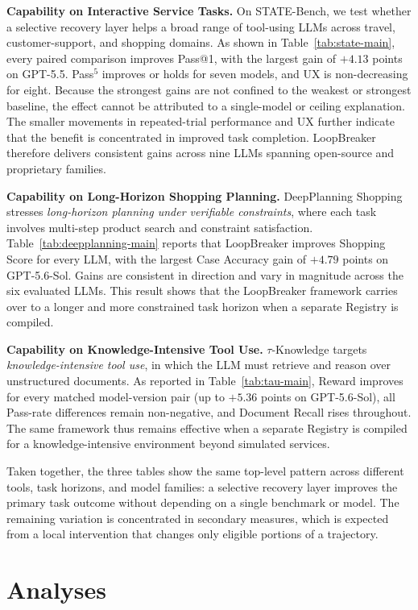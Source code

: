 \documentclass[letterpaper]{article}
\begin{document}
\textbf{Capability on Interactive Service Tasks.}\quad
On STATE-Bench, we test whether a selective recovery layer helps a broad range of tool-using LLMs across travel, customer-support, and shopping domains. As shown in Table~\ref{tab:state-main}, every paired comparison improves Pass@1, with the largest gain of $+4.13$ points on GPT-5.5. Pass$^5$ improves or holds for seven models, and UX is non-decreasing for eight. Because the strongest gains are not confined to the weakest or strongest baseline, the effect cannot be attributed to a single-model or ceiling explanation. The smaller movements in repeated-trial performance and UX further indicate that the benefit is concentrated in improved task completion. LoopBreaker therefore delivers consistent gains across nine LLMs spanning open-source and proprietary families.

\textbf{Capability on Long-Horizon Shopping Planning.}\quad
DeepPlanning Shopping stresses \emph{long-horizon planning under verifiable constraints}, where each task involves multi-step product search and constraint satisfaction. Table~\ref{tab:deepplanning-main} reports that LoopBreaker improves Shopping Score for every LLM, with the largest Case Accuracy gain of $+4.79$ points on GPT-5.6-Sol. Gains are consistent in direction and vary in magnitude across the six evaluated LLMs. This result shows that the LoopBreaker framework carries over to a longer and more constrained task horizon when a separate Registry is compiled.

\textbf{Capability on Knowledge-Intensive Tool Use.}\quad
$\tau$-Knowledge targets \emph{knowledge-intensive tool use}, in which the LLM must retrieve and reason over unstructured documents. As reported in Table~\ref{tab:tau-main}, Reward improves for every matched model-version pair (up to $+5.36$ points on GPT-5.6-Sol), all Pass-rate differences remain non-negative, and Document Recall rises throughout. The same framework thus remains effective when a separate Registry is compiled for a knowledge-intensive environment beyond simulated services.

Taken together, the three tables show the same top-level pattern across different tools, task horizons, and model families: a selective recovery layer improves the primary task outcome without depending on a single benchmark or model. The remaining variation is concentrated in secondary measures, which is expected from a local intervention that changes only eligible portions of a trajectory.


\section{Analyses}
\label{sec:analysis}
\end{document}
